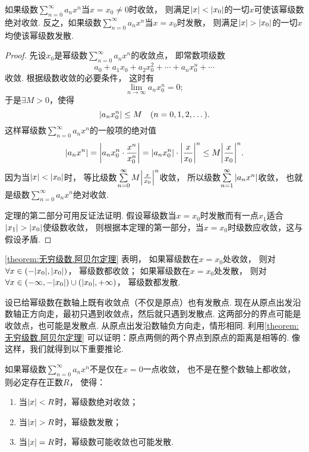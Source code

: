 \begin{theorem}[阿贝尔定理]\label{theorem:无穷级数.阿贝尔定理}
如果级数\(\sum\limits_{n=0}^\infty a_n x^n\)当\(x=x_0\neq0\)时收敛，
则满足\(\abs{x}<\abs{x_0}\)的一切\(x\)可使该幂级数绝对收敛.
反之，如果级数\(\sum\limits_{n=0}^\infty a_n x^n\)当\(x=x_0\)时发散，
则满足\(\abs{x}>\abs{x_0}\)的一切\(x\)均使该幂级数发散.
\begin{proof}
先设\(x_0\)是幂级数\(\sum\limits_{n=0}^\infty a_n x^n\)的收敛点，
即常数项级数\[
	a_0 + a_1 x_0 + a_2 x_0^2 + \dotsb + a_n x_0^n + \dotsb
\]收敛.
根据级数收敛的必要条件，
这时有\[
	\lim\limits_{n\to\infty} a_n x_0^n = 0;
\]
于是\(\exists M > 0\)，使得\[
	\abs{a_n x_0^n} \leq M
	\quad(n=0,1,2,\dotsc).
\]
这样幂级数\(\sum\limits_{n=0}^\infty a_n x^n\)的一般项的绝对值\[
	\abs{a_n x^n} = \abs{a_n x_0^n \cdot \frac{x^n}{x_0^n}}
	= \abs{a_n x_0^n} \cdot \abs{\frac{x}{x_0}}^n
	\leq M \abs{\frac{x}{x_0}}^n.
\]
因为当\(\abs{x}<\abs{x_0}\)时，
等比级数\(\sum\limits_{n=0}^\infty M \abs{\frac{x}{x_0}}^n\)收敛，
所以级数\(\sum\limits_{n=1}^\infty \abs{a_n x^n}\)收敛，
也就是级数\(\sum\limits_{n=0}^\infty a_n x^n\)绝对收敛.

定理的第二部分可用反证法证明.
假设幂级数当\(x=x_0\)时发散而有一点\(x_1\)适合\(\abs{x_1}>\abs{x_0}\)使级数收敛，
则根据本定理的第一部分，当\(x=x_0\)时级数应收敛，这与假设矛盾.
\end{proof}
\end{theorem}

\cref{theorem:无穷级数.阿贝尔定理} 表明，
如果幂级数在\(x=x_0\)处收敛，
则对\(\forall x\in(-\abs{x_0},\abs{x_0})\)，
幂级数都收敛；
如果幂级数在\(x=x_0\)处发散，
则对\(\forall x\in(-\infty,-\abs{x_0})\cup(\abs{x_0},+\infty)\)，
幂级数都发散.

设已给幂级数在数轴上既有收敛点（不仅是原点）也有发散点.
现在从原点出发沿数轴正方向走，最初只遇到收敛点，然后就只遇到发散点.
这两部分的界点可能是收敛点，也可能是发散点.
从原点出发沿数轴负方向走，情形相同.
利用\cref{theorem:无穷级数.阿贝尔定理} 可以证明：原点两侧的两个界点到原点的距离是相等的.
像这样，我们就得到以下重要推论.
\begin{corollary}\label{theorem:无穷级数.阿贝尔定理推论}
如果幂级数\(\sum\limits_{n=0}^\infty a_n x^n\)不是仅在\(x=0\)一点收敛，
也不是在整个数轴上都收敛，
则必定存在正数\(R\)，
使得：\begin{enumerate}
	\item 当\(\abs{x}<R\)时，幂级数绝对收敛；
	\item 当\(\abs{x}>R\)时，幂级数发散；
	\item 当\(\abs{x}=R\)时，幂级数可能收敛也可能发散.
\end{enumerate}
\end{corollary}

